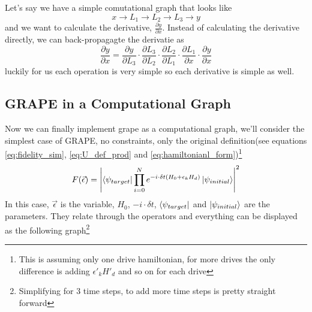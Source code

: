 \documentclass[english, a4paper, 12pt, twoside]{article}
\numberwithin{equation}{section} %
\begin{document}
Let's say we have a simple comutational graph that looks like
\[x \rightarrow L_1 \rightarrow L_2 \rightarrow L_3 \rightarrow y\] %
and we want to calculate the derivative, $\frac{\partial y}{\partial x}$. Instead of calculating the derivative directly, we can back-propagagte the derivatie as
\[\frac{\partial y}{\partial x} = \frac{\partial y}{\partial L_3} \cdot \frac{\partial L_3}{\partial L_2} \cdot \frac{\partial L_2}{\partial L_1} \cdot \frac{\partial L_1}{\partial x} \cdot \frac{\partial y}{\partial x}\]
luckily for us each operation is very simple so each derivative is simple as well.
\subsection{GRAPE in a Computational Graph}
Now we can finally implement grape as a computational graph, we'll consider the simplest case of GRAPE, no constraints, only the original definition(see equations \ref{eq:fidelity_sim}, \ref{eq:U_def_prod} and \ref{eq:hamiltonianl_form})\footnote{This is assuming only one drive hamiltonian, for more drives the only difference is adding $\epsilon'_k H'_d$ and so on for each drive} %
\[
    F(\vec{\epsilon}) = \abs{\bra{\psi_{target}} \prod_{i=0}^N e^{-i \cdot \delta t (H_0 + \epsilon_k H_d)} \ket{\psi_{initial}}}^2
\]
In this case, $\vec{\epsilon}$ is the variable, $H_0$, $-i \cdot \delta t$, $\bra{\psi_{target}}$ and $\ket{\psi_{initial}}$ are the parameters. They relate through the operators and everything can be displayed as the following graph\footnote{Simplifying for 3 time steps, to add more time steps is pretty straight forward}
\end{document}
